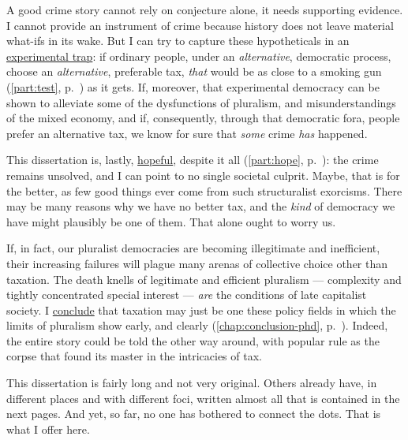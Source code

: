 A good crime story cannot rely on conjecture alone, it needs supporting evidence.
I cannot provide an instrument of crime because history does not leave material what-ifs in its wake.
But I can try to capture these hypotheticals in an \hyperref[part:test]{experimental trap}:
if ordinary %
people, under an \emph{alternative}, democratic process, choose an \emph{alternative}, preferable tax, \emph{that} would be as close to a smoking gun (\autoref{part:test}, p.~\pageref{part:test}) as it gets.
If, moreover, that experimental democracy can be shown to alleviate some of the dysfunctions of pluralism, and misunderstandings of the mixed economy, and if, consequently, through that democratic fora, people prefer an alternative tax, we know for sure that \emph{some} crime \emph{has} happened.

This dissertation is, lastly, \hyperref[part:hope]{hopeful}, despite it all (\autoref{part:hope}, p.~\pageref{part:hope}):
the crime remains unsolved, and I can point to no single societal culprit.
Maybe, that is for the better, as few good things ever come from such structuralist exorcisms.
There may be many reasons why we have no better tax, and the \emph{kind} of democracy we have might plausibly be one of them.
That alone ought to worry us.

If, in fact, our pluralist democracies are becoming illegitimate and inefficient, their increasing failures will plague many arenas of collective choice other than taxation.
The death knells of legitimate and efficient pluralism --- complexity and tightly concentrated special interest --- \emph{are} the conditions of late capitalist society.
I \hyperref[chap:conclusion-phd]{conclude} that taxation may just be one these policy fields in which the limits of pluralism show early, and clearly (\autoref{chap:conclusion-phd}, p.~\pageref{chap:conclusion-phd}).
Indeed, the entire story could be told the other way around, with popular rule as the corpse that found its master in the intricacies of tax.

This dissertation is fairly long and not very original.
Others already have, in different places and with different foci, written almost all that is contained in the next pages.
And yet, so far, no one has bothered to connect the dots.
That is what I offer here.

